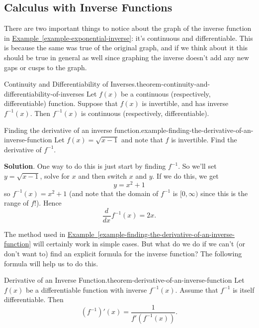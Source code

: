 \documentclass[10pt,]{book}
\numberwithin{equation}{section}
\newcommand{\dv}[3][]{\dfrac{d^{#1} #2}{d #3^{#1}}}
\begin{document}
\subsection[{Calculus with Inverse Functions}]{Calculus with Inverse Functions}\label{subsection-calculus-with-inverse-functions}
\hypertarget{p-206}{}%
There are two important things to notice about the graph of the inverse function in \hyperref[example-exponential-inverse]{Example~\ref{example-exponential-inverse}}: it's continuous and differentiable. This is because the same was true of the original graph, and if we think about it this should be true in general as well since graphing the inverse doesn't add any new gaps or cusps to the graph.%
\begin{theorem}{Continuity and Differentiability of Inverses.}{}{theorem-continuity-and-differentiability-of-inverses}%
\hypertarget{p-207}{}%
Let \(f(x)\) be a continuous (respectively, differentiable) function. Suppose that \(f(x)\) is invertible, and has inverse \(f^{-1}(x)\). Then \(f^{-1}(x)\) is continuous (respectively, differentiable).%
\end{theorem}
\begin{example}{Finding the derivative of an inverse function.}{example-finding-the-derivative-of-an-inverse-function}%
\hypertarget{p-208}{}%
Let \(f(x) = \sqrt{x-1}\) and note that \(f\) is invertible. Find the derivative of \(f^{-1}\).%
\par\smallskip%
\noindent\textbf{Solution}.\hypertarget{solution-45}{}\quad%
\hypertarget{p-209}{}%
One way to do this is just start by finding \(f^{-1}\). So we'll set \(y = \sqrt{x-1}\), solve for \(x\) and then switch \(x\) and \(y\). If we do this, we get%
\begin{equation*}
y = x^{2} + 1
\end{equation*}
so \(f^{-1}(x) = x^{2} + 1\) (and note that the domain of \(f^{-1}\) is \([0,\infty)\) since this is the range of \(f\)!). Hence%
\begin{equation*}
\dv{}{x}f^{-1}(x) = 2x.
\end{equation*}
%
\end{example}
\hypertarget{p-210}{}%
The method used in \hyperref[example-finding-the-derivative-of-an-inverse-function]{Example~\ref{example-finding-the-derivative-of-an-inverse-function}} will certainly work in simple cases. But what do we do if we can't (or don't want to) find an explicit formula for the inverse function? The following formula will help us to do this.%
\begin{theorem}{Derivative of an Inverse Function.}{}{theorem-derivative-of-an-inverse-function}%
\hypertarget{p-211}{}%
Let \(f(x)\) be a differentiable function with inverse \(f^{-1}(x)\). Assume that \(f^{-1}\) is itself differentiable. Then%
\begin{equation*}
(f^{-1})'(x) = \frac{1}{f'(f^{-1}(x))}.
\end{equation*}
%
\end{theorem}
\end{document}
